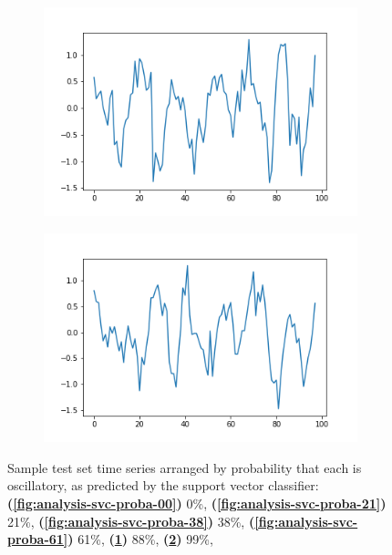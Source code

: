 \begin{figure}
  \begin{subfigure}[t]{0.45\textwidth}
  \centering
    \includegraphics[width=\linewidth]{proba_88}
    \caption{
    }
    \label{fig:analysis-svc-proba-88}
  \end{subfigure}%
  \begin{subfigure}[t]{0.45\textwidth}
  \centering
    \includegraphics[width=\linewidth]{proba_99}
    \caption{
    }
    \label{fig:analysis-svc-proba-99}
  \end{subfigure}
  \caption{
    Sample test set time series arranged by probability that each is oscillatory, as predicted by the support vector classifier:
    \textbf{(\ref{fig:analysis-svc-proba-00})} 0\%,
    \textbf{(\ref{fig:analysis-svc-proba-21})} 21\%,
    \textbf{(\ref{fig:analysis-svc-proba-38})} 38\%,
    \textbf{(\ref{fig:analysis-svc-proba-61})} 61\%,
    \textbf{(\ref{fig:analysis-svc-proba-88})} 88\%,
    \textbf{(\ref{fig:analysis-svc-proba-99})} 99\%,
  }
  \label{fig:analysis-svc-proba-gallery}
\end{figure}

